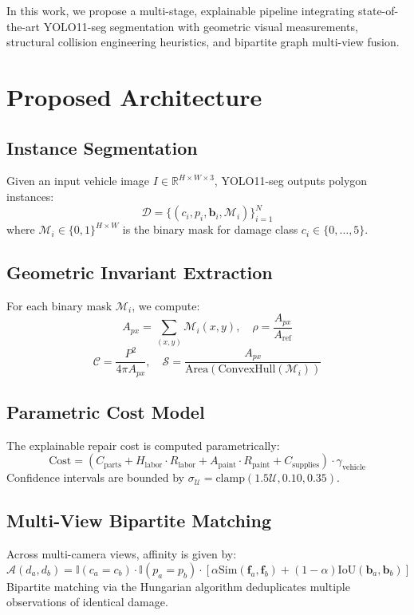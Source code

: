 \documentclass[conference]{IEEEtran}
\begin{document}
In this work, we propose a multi-stage, explainable pipeline integrating state-of-the-art YOLO11-seg segmentation with geometric visual measurements, structural collision engineering heuristics, and bipartite graph multi-view fusion.

\section{Proposed Architecture}
\subsection{Instance Segmentation}
Given an input vehicle image $I \in \mathbb{R}^{H \times W \times 3}$, YOLO11-seg outputs polygon instances:
\begin{equation}
\mathcal{D} = \{ (c_i, p_i, \mathbf{b}_i, \mathcal{M}_i) \}_{i=1}^N
\end{equation}
where $\mathcal{M}_i \in \{0, 1\}^{H \times W}$ is the binary mask for damage class $c_i \in \{0, \dots, 5\}$.

\subsection{Geometric Invariant Extraction}
For each binary mask $\mathcal{M}_i$, we compute:
\begin{equation}
A_{px} = \sum_{(x,y)} \mathcal{M}_i(x,y), \quad \rho = \frac{A_{px}}{A_{\text{ref}}}
\end{equation}
\begin{equation}
\mathcal{C} = \frac{P^2}{4 \pi A_{px}}, \quad \mathcal{S} = \frac{A_{px}}{\text{Area}(\text{ConvexHull}(\mathcal{M}_i))}
\end{equation}

\subsection{Parametric Cost Model}
The explainable repair cost is computed parametrically:
\begin{equation}
\text{Cost} = \left( C_{\text{parts}} + H_{\text{labor}} \cdot R_{\text{labor}} + A_{\text{paint}} \cdot R_{\text{paint}} + C_{\text{supplies}} \right) \cdot \gamma_{\text{vehicle}}
\end{equation}
Confidence intervals are bounded by $\sigma_{\mathcal{U}} = \text{clamp}(1.5 \mathcal{U}, 0.10, 0.35)$.

\subsection{Multi-View Bipartite Matching}
Across multi-camera views, affinity is given by:
\begin{equation}
\mathcal{A}(d_a, d_b) = \mathbb{I}(c_a = c_b) \cdot \mathbb{I}(p_a = p_b) \cdot \left[ \alpha \text{Sim}(\mathbf{f}_a, \mathbf{f}_b) + (1-\alpha) \text{IoU}(\mathbf{b}_a, \mathbf{b}_b) \right]
\end{equation}
Bipartite matching via the Hungarian algorithm deduplicates multiple observations of identical damage.
\end{document}
